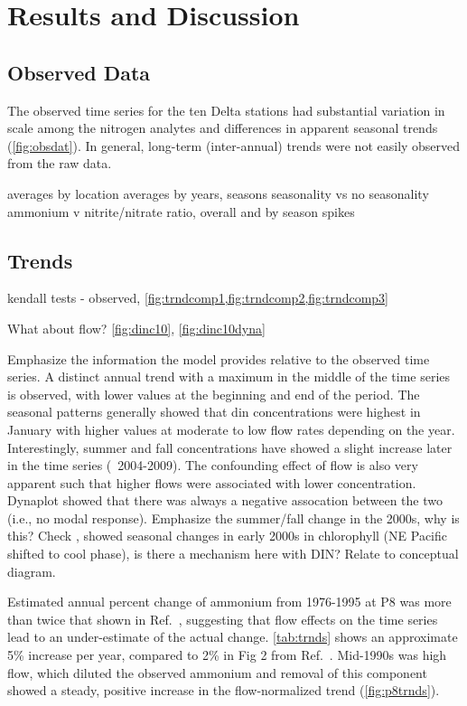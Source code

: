 \documentclass[journal = esthag, manuscript = article]{achemso}\usepackage[]{graphicx}\usepackage[]{color}
\begin{document}
\section{Results and Discussion}

\subsection{Observed Data}



The observed time series for the ten Delta stations had substantial variation in scale among the nitrogen analytes and differences in apparent seasonal trends (\cref{fig:obsdat}).  In general, long-term (inter-annual) trends were not easily observed from the raw data.  

averages by location
averages by years, seasons
seasonality vs no seasonality
ammonium v nitrite/nitrate ratio, overall and by season
spikes

\subsection{Trends}

kendall tests - observed, \cref{fig:trndcomp1,fig:trndcomp2,fig:trndcomp3}

What about flow? \cref{fig:dinc10}, \cref{fig:dinc10dyna}

Emphasize the information the model provides relative to the observed time series.  A distinct annual trend with a maximum in the middle of the time series is observed, with lower values at the beginning and end of the period.  The seasonal patterns generally showed that \ac{din} concentrations were highest in January with higher values at moderate to low flow rates depending on the year. Interestingly, summer and fall concentrations have showed a slight increase later in the time series (~2004-2009).  The confounding effect of flow is also very apparent such that higher flows were associated with lower concentration.  Dynaplot showed that there was always a negative assocation between the two (i.e., no modal response).  Emphasize the summer/fall change in the 2000s, why is this?  Check \cite{Cloern07}, showed seasonal changes in early 2000s in chlorophyll (NE Pacific shifted to cool phase), is there a mechanism here with DIN? Relate to conceptual diagram.

Estimated annual percent change of ammonium from 1976-1995 at P8 was more than twice that shown in Ref.~, suggesting that flow effects on the time series lead to an under-estimate of the actual change. \cref{tab:trnds} shows an approximate 5\% increase per year, compared to 2\% in Fig 2 from Ref.~.  Mid-1990s was high flow, which diluted the observed ammonium and removal of this component showed a steady, positive increase in the flow-normalized trend (\cref{fig:p8trnds}).  
\end{document}
